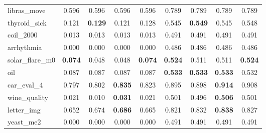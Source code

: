 \begin{figure}[ht]
\begin{tabular}{p{22mm}|*4{p{14mm}}|*4{p{14mm}}}
        libras\_move&\multicolumn{1}{c}{0.596}&\multicolumn{1}{c}{0.596}&\multicolumn{1}{c}{0.596}&\multicolumn{1}{c|}{0.596}&\multicolumn{1}{c}{0.789}&\multicolumn{1}{c}{0.789}&\multicolumn{1}{c}{0.789}&\multicolumn{1}{c}{0.789}\\
        thyroid\_sick&\multicolumn{1}{c}{0.121}&\multicolumn{1}{c}{\textbf{0.129}}&\multicolumn{1}{c}{0.121}&\multicolumn{1}{c|}{0.128}&\multicolumn{1}{c}{0.545}&\multicolumn{1}{c}{\textbf{0.549}}&\multicolumn{1}{c}{0.545}&\multicolumn{1}{c}{0.548}\\
        coil\_2000&\multicolumn{1}{c}{0.013}&\multicolumn{1}{c}{0.013}&\multicolumn{1}{c}{0.013}&\multicolumn{1}{c|}{0.013}&\multicolumn{1}{c}{0.491}&\multicolumn{1}{c}{0.491}&\multicolumn{1}{c}{0.491}&\multicolumn{1}{c}{0.491}\\
        arrhythmia&\multicolumn{1}{c}{0.000}&\multicolumn{1}{c}{0.000}&\multicolumn{1}{c}{0.000}&\multicolumn{1}{c|}{0.000}&\multicolumn{1}{c}{0.486}&\multicolumn{1}{c}{0.486}&\multicolumn{1}{c}{0.486}&\multicolumn{1}{c}{0.486}\\
        solar\_flare\_m0&\multicolumn{1}{c}{\textbf{0.074}}&\multicolumn{1}{c}{0.048}&\multicolumn{1}{c}{0.048}&\multicolumn{1}{c|}{\textbf{0.074}}&\multicolumn{1}{c}{\textbf{0.524}}&\multicolumn{1}{c}{0.511}&\multicolumn{1}{c}{0.511}&\multicolumn{1}{c}{\textbf{0.524}}\\
        oil&\multicolumn{1}{c}{0.087}&\multicolumn{1}{c}{0.087}&\multicolumn{1}{c}{0.087}&\multicolumn{1}{c|}{0.087}&\multicolumn{1}{c}{\textbf{0.533}}&\multicolumn{1}{c}{\textbf{0.533}}&\multicolumn{1}{c}{\textbf{0.533}}&\multicolumn{1}{c}{0.532}\\
        car\_eval\_4&\multicolumn{1}{c}{0.797}&\multicolumn{1}{c}{0.802}&\multicolumn{1}{c}{\textbf{0.835}}&\multicolumn{1}{c|}{0.823}&\multicolumn{1}{c}{0.895}&\multicolumn{1}{c}{0.898}&\multicolumn{1}{c}{\textbf{0.914}}&\multicolumn{1}{c}{0.908}\\
        wine\_quality&\multicolumn{1}{c}{0.021}&\multicolumn{1}{c}{0.010}&\multicolumn{1}{c}{\textbf{0.031}}&\multicolumn{1}{c|}{0.021}&\multicolumn{1}{c}{0.501}&\multicolumn{1}{c}{0.496}&\multicolumn{1}{c}{\textbf{0.506}}&\multicolumn{1}{c}{0.501}\\
        letter\_img&\multicolumn{1}{c}{0.652}&\multicolumn{1}{c}{0.674}&\multicolumn{1}{c}{\textbf{0.686}}&\multicolumn{1}{c|}{0.665}&\multicolumn{1}{c}{0.821}&\multicolumn{1}{c}{0.832}&\multicolumn{1}{c}{\textbf{0.838}}&\multicolumn{1}{c}{0.827}\\
        yeast\_me2&\multicolumn{1}{c}{0.000}&\multicolumn{1}{c}{0.000}&\multicolumn{1}{c}{0.000}&\multicolumn{1}{c|}{0.000}&\multicolumn{1}{c}{0.491}&\multicolumn{1}{c}{0.491}&\multicolumn{1}{c}{0.491}&\multicolumn{1}{c}{0.491}\\

\end{tabular}
\end{figure}
